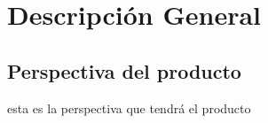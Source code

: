 \chapter{Descripción General}
\section{Perspectiva del producto}
esta es la perspectiva que tendrá el producto